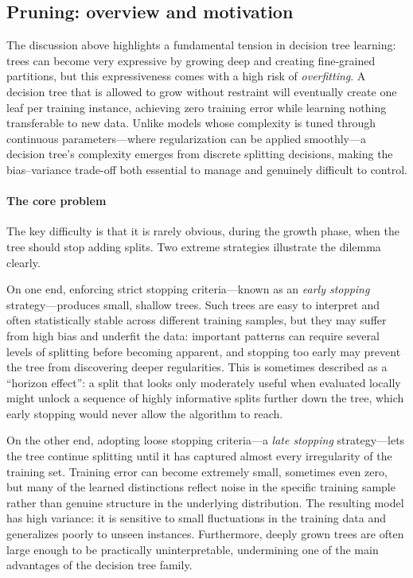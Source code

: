 \subsection*{Pruning: overview and motivation}

The discussion above highlights a fundamental tension in decision tree learning: trees can
become very expressive by growing deep and creating fine-grained partitions, but this
expressiveness comes with a high risk of \emph{overfitting}. A decision tree that is allowed
to grow without restraint will eventually create one leaf per training instance, achieving
zero training error while learning nothing transferable to new data. Unlike models whose
complexity is tuned through continuous parameters---where regularization can be applied
smoothly---a decision tree's complexity emerges from discrete splitting decisions, making the
bias--variance trade-off both essential to manage and genuinely difficult to control.

\paragraph{The core problem}

The key difficulty is that it is rarely obvious, during the growth phase, when the tree
should stop adding splits. Two extreme strategies illustrate the dilemma clearly.

On one end, enforcing strict stopping criteria---known as an \emph{early stopping}
strategy---produces small, shallow trees. Such trees are easy to interpret and often
statistically stable across different training samples, but they may suffer from high bias
and underfit the data: important patterns can require several levels of splitting before
becoming apparent, and stopping too early may prevent the tree from discovering deeper
regularities. This is sometimes described as a ``horizon effect'': a split that looks only
moderately useful when evaluated locally might unlock a sequence of highly informative splits
further down the tree, which early stopping would never allow the algorithm to reach.

On the other end, adopting loose stopping criteria---a \emph{late stopping} strategy---lets
the tree continue splitting until it has captured almost every irregularity of the training
set. Training error can become extremely small, sometimes even zero, but many of the learned
distinctions reflect noise in the specific training sample rather than genuine structure in
the underlying distribution. The resulting model has high variance: it is sensitive to small
fluctuations in the training data and generalizes poorly to unseen instances. Furthermore,
deeply grown trees are often large enough to be practically uninterpretable, undermining
one of the main advantages of the decision tree family.

